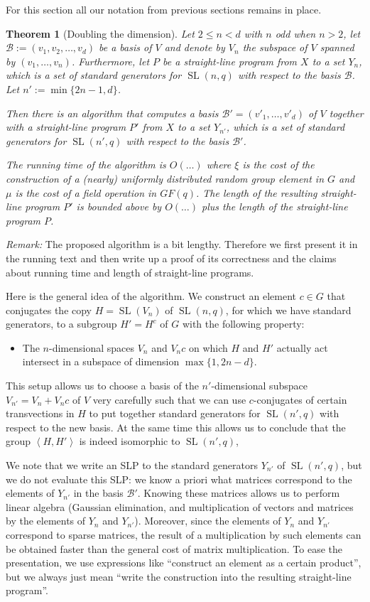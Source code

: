 \documentclass[a4paper,11pt]{article}
\def\SL{\operatorname{SL}}
\newcommand{\B}{\mathcal{B}}
\newtheorem{theorem}{Theorem}
\begin{document}
For this section all our notation from previous sections remains in place.

\begin{theorem}[Doubling the dimension]
\label{double}
Let $2 \le n < d$ with $n$ odd when $n > 2$, 
let $\B := (v_1, v_2, \ldots, v_d)$ be a basis of $V$
and denote by $V_n$ the subspace of $V$ spanned by $(v_1, \ldots, v_n)$. 
Furthermore, let $P$ be a straight-line program
from $X$ to a set $Y_n$, which is a set of standard
generators for $\SL(n,q)$ with respect to the basis $\B$.
Let $n' := \min\{ 2n-1, d\}$.

Then there is an algorithm that computes a basis $\B' = (v'_1, \ldots,
v'_d)$ of $V$ together with a straight-line program $P'$ from $X$
to a set $Y_{n'}$, which is a set of standard generators
for $\SL(n',q)$ with respect to the basis $\B'$.

The running time of the algorithm is $O(\ldots)$ where $\xi$ is the
cost of the construction of a (nearly) uniformly distributed random
group element in $G$ and $\mu$ is the cost of a field operation in
$GF(q)$. The length of the resulting straight-line program $P'$ is
bounded above by $O(\ldots)$ plus the length of the straight-line
program $P$.
\end{theorem}

\emph{Remark:} The proposed algorithm is a bit lengthy. Therefore
we first present it in the running text and then write up a proof of its
correctness and the claims about running time and length of
straight-line programs.

\smallskip
Here is the general idea of the algorithm. We construct an element $c \in G$ that 
conjugates the copy $H=\SL(V_n)$
of $\SL(n,q)$, for which we have standard generators, to a subgroup $H'=H^c$ of
$G$ with the following property:
\begin{itemize}
\item The $n$-dimensional spaces $V_n$ and $V_nc$ on which $H$ and $H'$ actually act 
intersect in a subspace of dimension $\max \{ 1, 2n-d \}$.
\end{itemize}
This setup allows us to choose a basis of the $n'$-dimensional
subspace $V_{n'}=V_n+V_nc$ of $V$ very carefully such that we can use 
$c$-conjugates of certain
transvections in $H$ to put together standard generators for $\SL(n',q)$
with respect to the new basis. At the same time this allows us to conclude 
that the group $\left<H,H'\right>$ is indeed isomorphic to $\SL(n',q)$,

We note that we write an SLP to the standard generators $Y_{n'}$ of $\SL(n',q)$,
but we do not evaluate this SLP: we know a priori what matrices correspond to the 
elements of $Y_{n'}$ in the basis $\B'$. Knowing these matrices allows us to perform
linear algebra (Gaussian elimination, and multiplication of vectors and matrices by the 
elements of $Y_n$ and $Y_{n'}$). Moreover, since the elements of $Y_n$ and $Y_{n'}$ 
correspond to sparse matrices, the result of a multiplication by such elements can be 
obtained faster than the general cost of matrix multiplication. 
To ease the presentation, we use expressions like ``construct an element
as a certain product'', but we always just mean ``write the construction
into the resulting straight-line program''.
\end{document}
